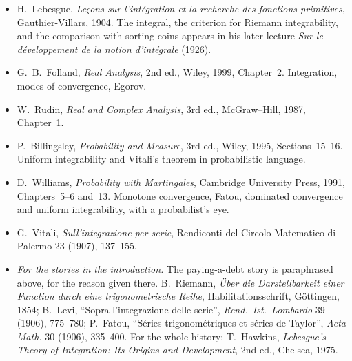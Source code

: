 \begin{itemize}
\item H.~Lebesgue, \emph{Le\c cons sur l'int\'egration et la recherche des fonctions primitives}, Gauthier-Villars, 1904. The integral, the criterion
for Riemann integrability, and the comparison with sorting coins appears in his later lecture \emph{Sur le d\'eveloppement de la notion
d'int\'egrale} (1926).
\item G.~B.~Folland, \emph{Real Analysis}, 2nd ed., Wiley, 1999, Chapter~2. Integration, modes of convergence, Egorov.
\item W.~Rudin, \emph{Real and Complex Analysis}, 3rd ed., McGraw--Hill, 1987, Chapter~1.
\item P.~Billingsley, \emph{Probability and Measure}, 3rd ed., Wiley, 1995, Sections~15--16. Uniform integrability and Vitali's theorem in
probabilistic language.
\item D.~Williams, \emph{Probability with Martingales}, Cambridge University Press, 1991, Chapters~5--6 and~13. Monotone convergence, Fatou,
dominated convergence and uniform integrability, with a probabilist's eye.
\item G.~Vitali, \emph{Sull'integrazione per serie}, Rendiconti del Circolo Matematico di Palermo 23 (1907), 137--155.
\item \emph{For the stories in the introduction.} The paying-a-debt story is paraphrased above, for the reason given there. B.~Riemann, \emph{\"Uber die Darstellbarkeit einer Function durch
eine trigonometrische Reihe}, Habilitationsschrift, G\"ottingen, 1854; B.~Levi, ``Sopra l'integrazione delle serie'', \emph{Rend.\ Ist.\ Lombardo} 39 (1906), 775--780; P.~Fatou,
``S\'eries trigonom\'etriques et s\'eries de Taylor'', \emph{Acta Math.} 30 (1906), 335--400. For the whole history: T.~Hawkins, \emph{Lebesgue's Theory of Integration: Its
Origins and Development}, 2nd ed., Chelsea, 1975.
\end{itemize}
